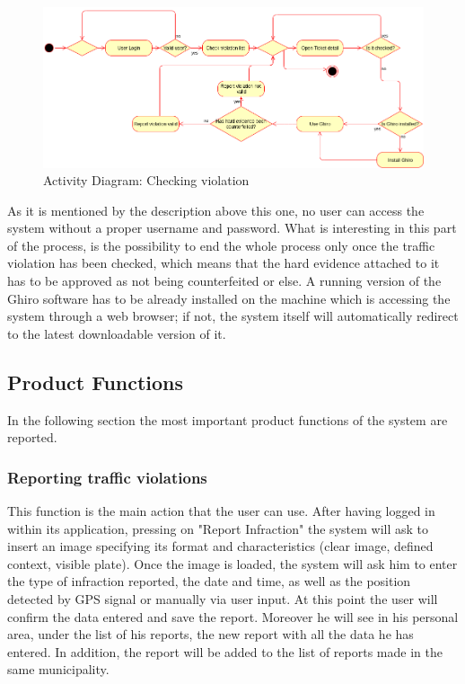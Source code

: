 \documentclass{article}
\begin{document}
\begin{figure}[H]
    \centering
    \includegraphics[scale=0.36]{Images/ActivityCheckViolation}
    \caption{Activity Diagram: Checking violation}
\end{figure}

As it is mentioned by the description above this one, no user can access the
system without a proper username and password. What is interesting in this part
of the process, is the possibility to end the whole process only once the
traffic violation has been checked, which means that the hard evidence attached
to it has to be approved as not being counterfeited or else. A running version
of the Ghiro software has to be already installed on the machine which is
accessing the system through a web browser; if not, the system itself will
automatically redirect to the latest downloadable version of it. 

\subsection{Product Functions}
In the following section the most important product functions of the system are
reported.
    \subsubsection{Reporting traffic violations}
    This function is the main action that the user can use. After having logged
    in within its application, pressing on "Report Infraction" the system will
    ask to insert an image specifying its format and characteristics (clear
    image, defined context, visible plate). Once the image is loaded, the system
    will ask him to enter the type of infraction reported, the date and time, as
    well as the position detected by GPS signal or manually via user input. At
    this point the user will confirm the data entered and save the report.
    Moreover he will see in his personal area, under the list of his reports,
    the new report with all the data he has entered. In addition, the report
    will be added to the list of reports made in the same municipality.
\end{document}
